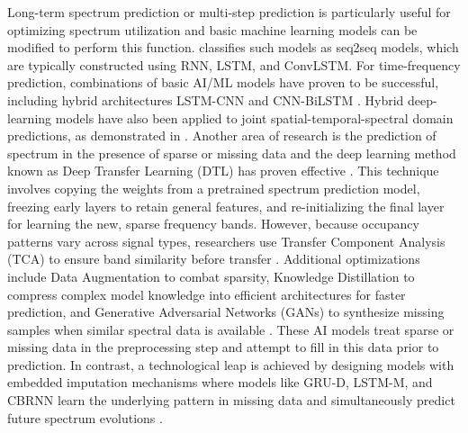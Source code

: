 \documentclass[lettersize,journal]{IEEEtran}
\begin{document}
Long-term spectrum prediction or multi-step prediction is particularly useful for optimizing spectrum utilization and basic machine learning models can be modified to perform this function. \cite{Wang_2024} classifies such models as seq2seq models, which are typically constructed using RNN, LSTM, and ConvLSTM. For time-frequency prediction, combinations of basic AI/ML models have proven to be successful, including hybrid architectures LSTM-CNN \cite{Zhang_2021_Accurate} and CNN-BiLSTM \cite{Ding_2020_Deep}. Hybrid deep-learning models have also been applied to joint spatial-temporal-spectral domain predictions, as demonstrated in \cite{Shawel_2019, Wen_2023}.
Another area of research is the prediction of spectrum in the presence of sparse or missing data and the deep learning method known as Deep Transfer Learning (DTL) has proven effective \cite{Li_2023}. This technique involves copying the weights from a pretrained spectrum prediction model, freezing early layers to retain general features, and re-initializing the final layer for learning the new, sparse frequency bands. However, because occupancy patterns vary across signal types, researchers use Transfer Component Analysis (TCA) to ensure band similarity before transfer \cite{Li_2023}. Additional optimizations include Data Augmentation to combat sparsity, Knowledge Distillation \cite{Cheng_2023} to compress complex model knowledge into efficient architectures for faster prediction, and Generative Adversarial Networks (GANs) to synthesize missing samples when similar spectral data is available \cite{Lin_2021}. These AI models treat sparse or missing data in the preprocessing step and attempt to fill in this data prior to prediction. In contrast, a technological leap is achieved by designing models with embedded imputation mechanisms where models like GRU-D, LSTM-M, and CBRNN learn the underlying pattern in missing data and simultaneously predict future spectrum evolutions \cite{Wang_2024}.  
\end{document}
